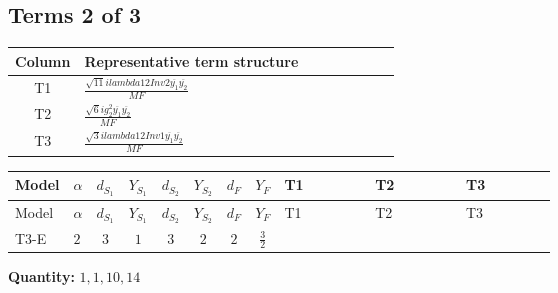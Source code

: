 \documentclass[8pt]{article}
\begin{document}
\begin{landscape}
\subsection*{Terms 2 of 3}
\begin{center}
\begin{tabular}{@{}c >{\raggedright\arraybackslash}p{0.82\linewidth}@{}}
\toprule
Column & Representative term structure \\
\midrule
T1 & \(\displaystyle \frac{\sqrt{11} i lambda12Inv2 \overline{y_{1}} \overline{y_{2}}}{MF}\) \\
\midrule
T2 & \(\displaystyle \frac{\sqrt{6} i g_{2}^{2} \overline{y_{1}} \overline{y_{2}}}{MF}\) \\
\midrule
T3 & \(\displaystyle \frac{\sqrt{3} i lambda12Inv1 \overline{y_{1}} \overline{y_{2}}}{MF}\) \\
\midrule
\bottomrule
\end{tabular}
\end{center}
\smallskip
\tiny
\begin{longtable}{@{}llcccccc >{\raggedright\arraybackslash}p{0.21\linewidth} >{\raggedright\arraybackslash}p{0.21\linewidth} >{\raggedright\arraybackslash}p{0.21\linewidth}@{}}
\toprule
Model & $\alpha$ & $d_{S_1}$ & $Y_{S_1}$ & $d_{S_2}$ & $Y_{S_2}$ & $d_F$ & $Y_F$ & T1 & T2 & T3 \\
\midrule
\endfirsthead
\toprule
Model & $\alpha$ & $d_{S_1}$ & $Y_{S_1}$ & $d_{S_2}$ & $Y_{S_2}$ & $d_F$ & $Y_F$ & T1 & T2 & T3 \\
\midrule
\endhead
T3-E & $2$ & $3$ & $1$ & $3$ & $2$ & $2$ & $\frac{3}{2}$ & \scriptsize\adjustbox{max width=\linewidth}{$\begin{gathered} - \frac{3 \sqrt{11} i lambda12Inv2 \overline{y_{1}} \overline{y_{2}}}{22 MF}\end{gathered}$} & \scriptsize\adjustbox{max width=\linewidth}{$\begin{gathered} - \frac{\sqrt{6} i g_{2}^{2} \overline{y_{1}} \overline{y_{2}}}{3 MF}\end{gathered}$} & \scriptsize\adjustbox{max width=\linewidth}{$\begin{gathered} \frac{\sqrt{3} i lambda12Inv1 \overline{y_{1}} \overline{y_{2}}}{6 MF}\end{gathered}$} \\
\midrule
\bottomrule
\end{longtable}
\clearpage
\noindent\textbf{Quantity: }$\mathrm{1,1,10,14}$\par\smallskip

\end{landscape}
\end{document}
